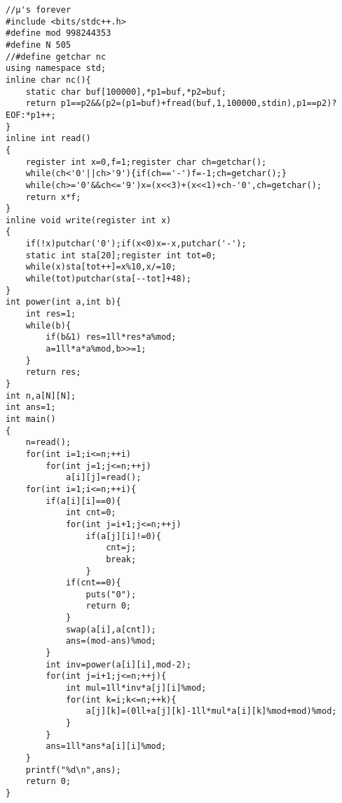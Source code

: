 \begin{verbatim}
//μ's forever
#include <bits/stdc++.h>
#define mod 998244353
#define N 505
//#define getchar nc
using namespace std;
inline char nc(){
    static char buf[100000],*p1=buf,*p2=buf;
    return p1==p2&&(p2=(p1=buf)+fread(buf,1,100000,stdin),p1==p2)?EOF:*p1++;
}
inline int read()
{
    register int x=0,f=1;register char ch=getchar();
    while(ch<'0'||ch>'9'){if(ch=='-')f=-1;ch=getchar();}
    while(ch>='0'&&ch<='9')x=(x<<3)+(x<<1)+ch-'0',ch=getchar();
    return x*f;
}
inline void write(register int x)
{
    if(!x)putchar('0');if(x<0)x=-x,putchar('-');
    static int sta[20];register int tot=0;
    while(x)sta[tot++]=x%10,x/=10;
    while(tot)putchar(sta[--tot]+48);
}
int power(int a,int b){
    int res=1;
    while(b){
        if(b&1) res=1ll*res*a%mod;
        a=1ll*a*a%mod,b>>=1;
    }
    return res;
}
int n,a[N][N];
int ans=1;
int main()
{
    n=read();
    for(int i=1;i<=n;++i)
        for(int j=1;j<=n;++j)
            a[i][j]=read();
    for(int i=1;i<=n;++i){
        if(a[i][i]==0){
            int cnt=0;
            for(int j=i+1;j<=n;++j)
                if(a[j][i]!=0){
                    cnt=j;
                    break;
                }
            if(cnt==0){
                puts("0");
                return 0;
            }
            swap(a[i],a[cnt]);
            ans=(mod-ans)%mod;
        }
        int inv=power(a[i][i],mod-2);
        for(int j=i+1;j<=n;++j){
            int mul=1ll*inv*a[j][i]%mod;
            for(int k=i;k<=n;++k){
                a[j][k]=(0ll+a[j][k]-1ll*mul*a[i][k]%mod+mod)%mod;
            }
        }
        ans=1ll*ans*a[i][i]%mod;
    }
    printf("%d\n",ans);
    return 0;
}
\end{verbatim}
